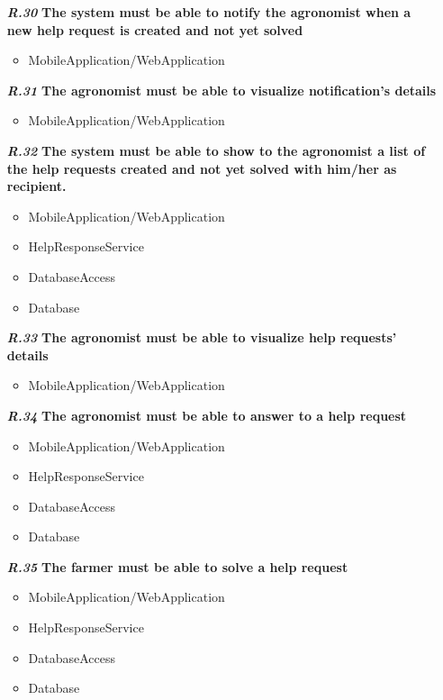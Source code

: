 \begin{itemize}
\item [\textbf{\textit{R.30}}] \textbf{The system must be able to notify the agronomist when a new help request is created and not yet solved}
\begin{itemize}
     \item MobileApplication/WebApplication
\end{itemize} 

\item [\textbf{\textit{R.31}}] \textbf{The agronomist must be able to visualize notification’s details}
\begin{itemize}
     \item MobileApplication/WebApplication
\end{itemize} 

\item [\textbf{\textit{R.32}}] \textbf{The system must be able to show to the agronomist a list of the help requests created and not yet solved with him/her as recipient.}
\begin{itemize}
     \item MobileApplication/WebApplication
     \item HelpResponseService
     \item DatabaseAccess
     \item Database
\end{itemize} 

\item [\textbf{\textit{R.33}}]\textbf{ The agronomist must be able to visualize help requests' details}
\begin{itemize}
     \item MobileApplication/WebApplication
\end{itemize} 

\item [\textbf{\textit{R.34}}] \textbf{The agronomist must be able to answer to a help request}
\begin{itemize}
     \item MobileApplication/WebApplication
     \item HelpResponseService
     \item DatabaseAccess
     \item Database
\end{itemize} 

\item [\textbf{\textit{R.35}}] \textbf{The farmer must be able to solve a help request}
\begin{itemize}
     \item MobileApplication/WebApplication
     \item HelpResponseService
     \item DatabaseAccess
     \item Database
\end{itemize} 


\end{itemize}
